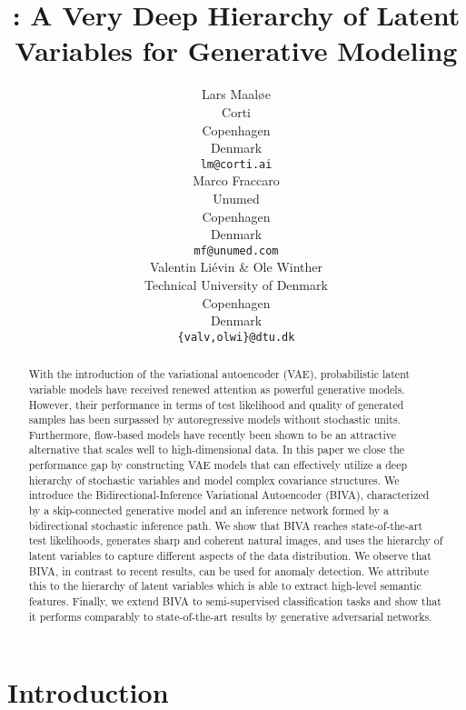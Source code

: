 \documentclass{article}
\title{\nm: A Very Deep Hierarchy of Latent Variables for Generative Modeling}
\author{Lars Maal{\o}e \\
  Corti\\
  Copenhagen\\
  Denmark \\
  \texttt{lm@corti.ai} \\
  \And
  Marco Fraccaro \\
  Unumed\\
  Copenhagen\\
  Denmark\\
  \texttt{mf@unumed.com}\\
  \And
  Valentin Li\'evin \& Ole Winther\\
  Technical University of Denmark\\
  Copenhagen\\
  Denmark\\
  \texttt{\{valv,olwi\}@dtu.dk}\\
}
\begin{document}
\maketitle

\begin{abstract} 
With the introduction of the variational autoencoder (VAE), probabilistic latent variable models have received renewed attention as powerful generative models. However, their performance in terms of test likelihood and quality of generated samples has been surpassed by autoregressive models without stochastic units. Furthermore, flow-based models have recently been shown to be an attractive alternative that scales well to high-dimensional data. In this paper we close the performance gap by constructing VAE models that can effectively utilize a deep hierarchy of stochastic variables and model complex covariance structures. We introduce the Bidirectional-Inference Variational Autoencoder (BIVA), characterized by a skip-connected generative model and an inference network formed by a bidirectional stochastic inference path. We show that BIVA reaches state-of-the-art test likelihoods, generates sharp and coherent natural images, and uses the hierarchy of latent variables to capture different aspects of the data distribution. We observe that BIVA, in contrast to recent results, can be used for anomaly detection. We attribute this to the hierarchy of latent variables which is able to extract high-level semantic features. Finally, we extend BIVA to semi-supervised classification tasks and show that it performs comparably to state-of-the-art results by generative adversarial networks.
\end{abstract}

\section{Introduction}
\end{document}
